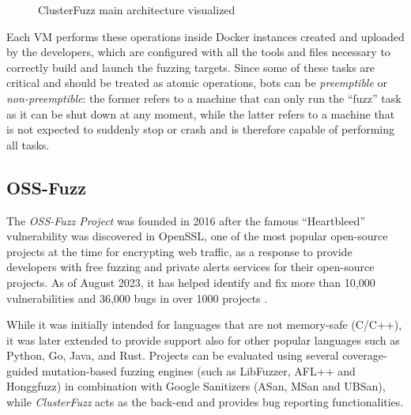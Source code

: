\begin{figure}[h]
\caption{ClusterFuzz main architecture visualized \cite{clusterfuzz_docs}}
\label{fig:clusterfuzz_architecture}
\end{figure}

Each VM performs these operations inside Docker instances created and uploaded by the developers, which are configured with all the tools and files necessary to correctly build and launch the fuzzing targets. Since some of these tasks are critical and should be treated as atomic operations, bots can be \textit{preemptible} or \textit{non-preemptible}: the former refers to a machine that can only run the ``fuzz'' task as it can be shut down at any moment, while the latter refers to a machine that is not expected to suddenly stop or crash and is therefore capable of performing all tasks.



\subsection{OSS-Fuzz}
The \textit{OSS-Fuzz Project} \cite{ossfuzz_paper} was founded in 2016 after the famous ``Heartbleed'' vulnerability was discovered in OpenSSL, one of the most popular open-source projects at the time for encrypting web traffic, as a response to provide developers with free fuzzing and private alerts services for their open-source projects. As of August 2023, it has helped identify and fix more than 10,000 vulnerabilities and 36,000 bugs in over 1000 projects \cite{ossfuzz_docs}.


While it was initially intended for languages that are not memory-safe (C/C++), it was later extended to provide support also for other popular languages such as Python, Go, Java, and Rust. Projects can be evaluated using several coverage-guided mutation-based fuzzing engines (such as LibFuzzer, AFL++ and Honggfuzz) in combination with Google Sanitizers (ASan, MSan and UBSan), while \textit{ClusterFuzz} acts as the back-end and provides bug reporting functionalities.


